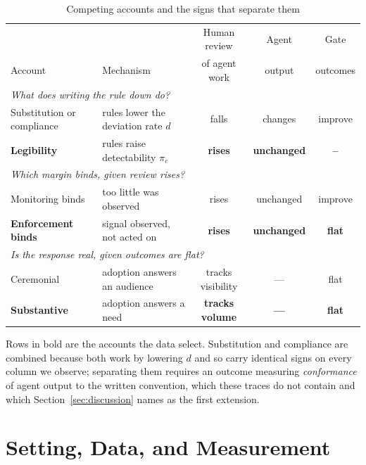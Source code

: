 \documentclass[mnsc]{informs4}
\begin{document}
\begin{table}[t]
\caption{Competing accounts and the signs that separate them}
\label{tab:predictions}
\centering\small
\begin{tabular}{llccc}
\toprule
 & & Human review & Agent & Gate \\
Account & Mechanism & of agent work & output & outcomes \\
\midrule
\multicolumn{5}{l}{\emph{What does writing the rule down do?}} \\
Substitution or compliance & rules lower the deviation rate $d$ & falls & changes & improve \\
\textbf{Legibility} & rules raise detectability $\pi_e$ & \textbf{rises} & \textbf{unchanged} & \textbf{--} \\[3pt]
\multicolumn{5}{l}{\emph{Which margin binds, given review rises?}} \\
Monitoring binds & too little was observed & rises & unchanged & improve \\
\textbf{Enforcement binds} & signal observed, not acted on & \textbf{rises} & \textbf{unchanged} & \textbf{flat} \\[3pt]
\multicolumn{5}{l}{\emph{Is the response real, given outcomes are flat?}} \\
Ceremonial & adoption answers an audience & tracks visibility & --- & flat \\
\textbf{Substantive} & adoption answers a need & \textbf{tracks volume} & \textbf{---} & \textbf{flat} \\
\bottomrule
\end{tabular}
\par\vspace{2pt}
\footnotesize Rows in bold are the accounts the data select. Substitution and
compliance are combined because both work by lowering $d$ and so carry identical
signs on every column we observe; separating them requires an outcome measuring
\emph{conformance} of agent output to the written convention, which these traces do
not contain and which Section~\ref{sec:discussion} names as the first extension.
\end{table}

\section{Setting, Data, and Measurement}
\label{sec:data}
\end{document}
